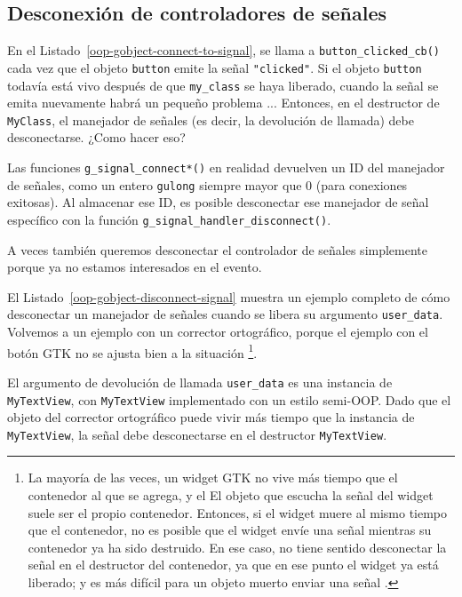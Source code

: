 \subsection{Desconexión de controladores de señales}

En el Listado~\ref{oop-gobject-connect-to-signal}, se llama a \lstinline{button_clicked_cb()} cada vez que el objeto \lstinline{button} emite la señal \lstinline{"clicked"}. Si el objeto \lstinline{button} todavía está vivo después de que \lstinline{my_class} se haya liberado, cuando la señal se emita nuevamente habrá un pequeño problema ... Entonces, en el destructor de \lstinline{MyClass}, el manejador de señales (es decir, la devolución de llamada) debe desconectarse. ¿Como hacer eso?

Las funciones \lstinline{g_signal_connect*()} en realidad devuelven un ID del manejador de señales, como un entero \lstinline{gulong} siempre mayor que 0 (para conexiones exitosas). Al almacenar ese ID, es posible desconectar ese manejador de señal específico con la función \lstinline{g_signal_handler_disconnect()}.

A veces también queremos desconectar el controlador de señales simplemente porque ya no estamos interesados en el evento.

El Listado~\ref{oop-gobject-disconnect-signal} muestra un ejemplo completo de cómo desconectar un manejador de señales cuando se libera su argumento \lstinline{user_data}. Volvemos a un ejemplo con un corrector ortográfico, porque el ejemplo con el botón GTK no se ajusta bien a la situación \footnote{La mayoría de las veces, un widget GTK no vive más tiempo que el contenedor al que se agrega, y el El objeto que escucha la señal del widget suele ser el propio contenedor. Entonces, si el widget muere al mismo tiempo que el contenedor, no es posible que el widget envíe una señal mientras su contenedor ya ha sido destruido. En ese caso, no tiene sentido desconectar la señal en el destructor del contenedor, ya que en ese punto el widget ya está liberado; y es más difícil para un objeto muerto enviar una señal \footnotemark.}.

El argumento de devolución de llamada \lstinline{user_data} es una instancia de \lstinline{MyTextView}, con \lstinline{MyTextView} implementado con un estilo semi-OOP. Dado que el objeto del corrector ortográfico puede vivir más tiempo que la instancia de \lstinline{MyTextView}, la señal debe desconectarse en el destructor \lstinline{MyTextView}.

